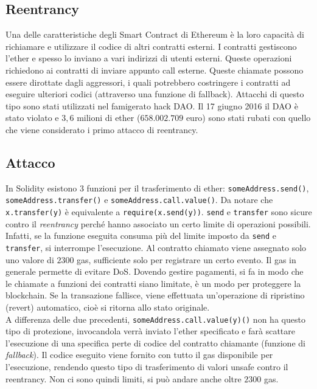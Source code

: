 \subsection{Reentrancy}

Una delle caratteristiche degli Smart Contract di Ethereum è la loro capacità di
richiamare e utilizzare il codice di altri contratti esterni. I contratti
gestiscono l'ether e spesso lo inviano a
vari indirizzi di utenti esterni. Queste operazioni richiedono ai contratti di
inviare appunto call esterne.
Queste chiamate possono essere dirottate dagli aggressori, i quali potrebbero
costringere i contratti ad eseguire ulteriori codici
(attraverso una funzione di fallback). Attacchi di questo
tipo sono stati utilizzati nel famigerato hack DAO.
Il 17 giugno 2016 il DAO è stato violato e $3,6$ milioni di ether ($658.002.709$ euro)
sono stati rubati con quello che viene considerato i primo attacco di reentrancy.

\subsection{Attacco}

In Solidity esistono 3 funzioni per il trasferimento di ether: \verb|someAddress.send()|,
\verb|someAddress.transfer()| e \verb|someAddress.call.value()|.
Da notare che \verb|x.transfer(y)| è equivalente a \verb|require(x.send(y))|.
\verb|send| e \verb|transfer| sono sicure contro il \textit{reentrancy} perché
hanno associato un certo limite di operazioni possibili.
Infatti, se la funzione eseguita consuma più del limite imposto da \verb|send| e \verb|transfer|,
si interrompe l'esecuzione.
Al contratto chiamato viene assegnato solo uno valore di $2300$
gas, sufficiente solo per registrare un certo evento.
Il gas in generale permette di evitare DoS. Dovendo gestire pagamenti,
si fa in modo che le chiamate a funzioni dei contratti siano limitate, è un modo
per proteggere la blockchain.
Se la transazione fallisce, viene effettuata un'operazione di ripristino (revert)
automatico, cioè si ritorna allo stato originale.\\
A differenza delle due precedenti, \verb|someAddress.call.value(y)()| non ha questo
tipo di protezione, invocandola verrà inviato
l'ether specificato e farà scattare
l'esecuzione di una specifica perte di codice del contratto chiamante
(funzione di \textit{fallback}).
Il codice eseguito viene fornito con tutto il gas
disponibile per l'esecuzione, rendendo
questo tipo di trasferimento di valori unsafe contro il reentrancy.
Non ci sono quindi limiti, si può andare anche oltre $2300$ gas.

